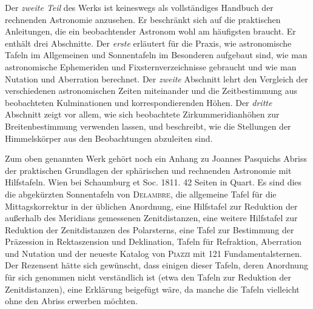 Der \emph{zweite Teil} des Werks ist keineswegs als vollständiges Handbuch der rechnenden Astronomie anzusehen. Er beschränkt sich auf die praktischen Anleitungen, die ein beobachtender Astronom wohl am häufigsten braucht. Er enthält drei Abschnitte. Der \emph{erste} erläutert für die Praxis, wie astronomische Tafeln im Allgemeinen und Sonnentafeln im Besonderen aufgebaut sind, wie man astronomische Ephemeriden und Fixsternverzeichnisse gebraucht und wie man Nutation und Aberration berechnet. Der \emph{zweite} Abschnitt lehrt den Vergleich der verschiedenen astronomischen Zeiten miteinander und die Zeitbestimmung aus beobachteten Kulminationen und korrespondierenden Höhen. Der \emph{dritte} Abschnitt zeigt vor allem, wie sich beobachtete Zirkummeridianhöhen zur Breitenbestimmung verwenden lassen, und beschreibt, wie die Stellungen der Himmelskörper aus den Beobachtungen abzuleiten sind.

Zum oben genannten Werk gehört noch ein Anhang zu Joannes Pasquichs Abriss der praktischen Grundlagen der sphärischen und rechnenden Astronomie mit Hilfstafeln. Wien bei Schaumburg et Soc. 1811. 42 Seiten in Quart. Es sind dies die abgekürzten Sonnentafeln von \textsc{Delambre}, die allgemeine Tafel für die Mittagskorrektur in der üblichen Anordnung, eine Hilfstafel zur Reduktion der außerhalb des Meridians gemessenen Zenitdistanzen, eine weitere Hilfstafel zur Reduktion der Zenitdistanzen des Polarsterns, eine Tafel zur Bestimmung der Präzession in Rektaszension und Deklination, Tafeln für Refraktion, Aberration und Nutation und der neueste Katalog von \textsc{Piazzi} mit 121 Fundamentalsternen. Der Rezensent hätte sich gewünscht, dass einigen dieser Tafeln, deren Anordnung für sich genommen nicht verständlich ist (etwa den Tafeln zur Reduktion der Zenitdistanzen), eine Erklärung beigefügt wäre, da manche die Tafeln vielleicht ohne den Abriss erwerben möchten.
